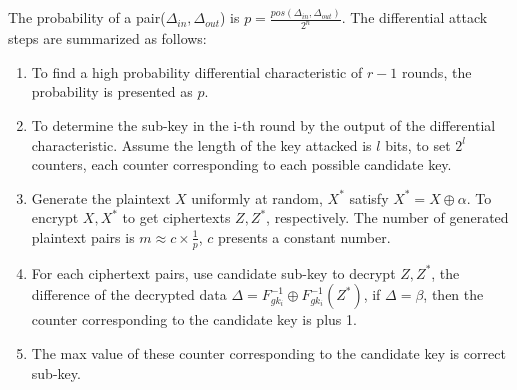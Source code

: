 The probability of a pair($\Delta_{in}, \Delta_{out}$) is $p=\frac{pos(\Delta_{in}, \Delta_{out})}{2^n}$. The differential attack steps are summarized as follows:
\begin{enumerate}
    \item To find a high probability differential characteristic of $r-1$ rounds, the probability is presented as $p$.
    \item To determine the sub-key in the i-th round by the output of the differential characteristic. Assume the length of the key attacked is $l$ bits, to set $2^l$ counters, each counter corresponding to each possible candidate key.
    \item Generate the plaintext  $X$ uniformly at random, $X^*$ satisfy $X^*=X\oplus \alpha$. To encrypt $X, X^*$ to get ciphertexts $Z, Z^*$, respectively. The number of generated plaintext pairs is $m \approx c \times \frac{1}{p}$, $c$ presents a constant number.
    \item For each ciphertext pairs, use candidate sub-key to decrypt $Z, Z^*$, the difference of the decrypted data $\Delta = F^{-1}_{gk_i}\oplus F^{-1}_{gk_i}(Z^*)$, if $\Delta = \beta$, then the counter corresponding to the candidate key is plus 1.
    \item The max value of these counter corresponding to the candidate key is correct sub-key.
\end{enumerate}

